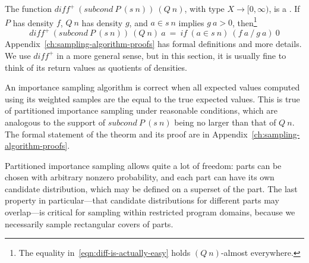 The function $diff^+~(subcond~P~(s~n))~(Q~n)$, with type $X \to [0,\infty)$, is a .
If $P$ has density $f$, $Q~n$ has density $g$, and $a \in s~n$ implies $g~a > 0$, then\footnote{The equality in~\eqref{eqn:diff-is-actually-easy} holds $(Q~n)$-almost everywhere.}
\begin{equation}
	diff^+~(subcond~P~(s~n))~(Q~n)~a\ =\ if~(a \in s~n)~(f~a~{/}~g~a)~0
\label{eqn:diff-is-actually-easy}
\end{equation}
Appendix~\ref{ch:sampling-algorithm-proofs} has formal definitions and more details.
We use $diff^+$ in a more general sense, but in this section, it is usually fine to think of its return values as quotients of densities.

An importance sampling algorithm is correct when all expected values computed using its weighted samples are the equal to the true expected values.
This is true of partitioned importance sampling under reasonable conditions, which are analogous to the support of $subcond~P~(s~n)$ being no larger than that of $Q~n$.
The formal statement of the theorm and its proof are in Appendix~\ref{ch:sampling-algorithm-proofs}.

Partitioned importance sampling allows quite a lot of freedom: parts can be chosen with arbitrary nonzero probability, and each part can have its own candidate distribution, which may be defined on a superset of the part.
The last property in particular---that candidate distributions for different parts may overlap---is critical for sampling within restricted program domains, because we necessarily sample rectangular covers of parts.

